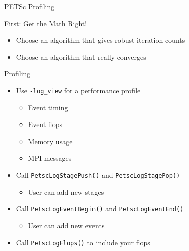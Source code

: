 \begin{frame}[fragile]{PETSc Profiling}

\begin{block}{First: Get the Math Right!}
\begin{itemize}
  \item Choose an algorithm that gives robust iteration counts
  \item Choose an algorithm that really converges
\end{itemize}  
\end{block}
  
\begin{block}{Profiling}
\begin{itemize}
  \item Use \lstinline|-log_view| for a performance profile
  \begin{itemize}
    \item Event timing
    \item Event flops
    \item Memory usage
    \item MPI messages
  \end{itemize}

  \item Call \lstinline|PetscLogStagePush()| and \lstinline|PetscLogStagePop()|
  \begin{itemize}
    \item User can add new stages
  \end{itemize}

  \item Call \lstinline|PetscLogEventBegin()| and \lstinline|PetscLogEventEnd()|
  \begin{itemize}
    \item User can add new events
  \end{itemize}

  \item Call \lstinline|PetscLogFlops()| to include your flops
\end{itemize}
\end{block}

\end{frame}

